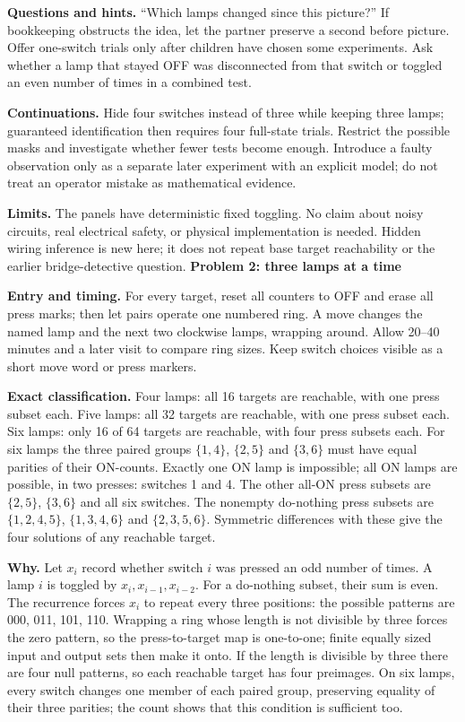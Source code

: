 \documentclass[11pt]{article}
\newcommand\lead[1]{\textbf{#1}\par}
\begin{document}
\textbf{Questions and hints.} ``Which lamps changed since this picture?'' If bookkeeping obstructs the idea, let the partner preserve a second before picture. Offer one-switch trials only after children have chosen some experiments. Ask whether a lamp that stayed OFF was disconnected from that switch or toggled an even number of times in a combined test.

\textbf{Continuations.} Hide four switches instead of three while keeping three lamps; guaranteed identification then requires four full-state trials. Restrict the possible masks and investigate whether fewer tests become enough. Introduce a faulty observation only as a separate later experiment with an explicit model; do not treat an operator mistake as mathematical evidence.

\textbf{Limits.} The panels have deterministic fixed toggling. No claim about noisy circuits, real electrical safety, or physical implementation is needed. Hidden wiring inference is new here; it does not repeat base target reachability or the earlier bridge-detective question.
\newpage
\lead{Problem 2: three lamps at a time}
\textbf{Entry and timing.} For every target, reset all counters to OFF and erase all press marks; then let pairs operate one numbered ring. A move changes the named lamp and the next two clockwise lamps, wrapping around. Allow 20--40 minutes and a later visit to compare ring sizes. Keep switch choices visible as a short move word or press markers.

\textbf{Exact classification.} Four lamps: all 16 targets are reachable, with one press subset each. Five lamps: all 32 targets are reachable, with one press subset each. Six lamps: only 16 of 64 targets are reachable, with four press subsets each. For six lamps the three paired groups $\{1,4\}$, $\{2,5\}$ and $\{3,6\}$ must have equal parities of their ON-counts. Exactly one ON lamp is impossible; all ON lamps are possible, in two presses: switches 1 and 4. The other all-ON press subsets are $\{2,5\}$, $\{3,6\}$ and all six switches. The nonempty do-nothing press subsets are $\{1,2,4,5\}$, $\{1,3,4,6\}$ and $\{2,3,5,6\}$. Symmetric differences with these give the four solutions of any reachable target.

\textbf{Why.} Let $x_i$ record whether switch $i$ was pressed an odd number of times. A lamp $i$ is toggled by $x_i,x_{i-1},x_{i-2}$. For a do-nothing subset, their sum is even. The recurrence forces $x_i$ to repeat every three positions: the possible patterns are 000, 011, 101, 110. Wrapping a ring whose length is not divisible by three forces the zero pattern, so the press-to-target map is one-to-one; finite equally sized input and output sets then make it onto. If the length is divisible by three there are four null patterns, so each reachable target has four preimages. On six lamps, every switch changes one member of each paired group, preserving equality of their three parities; the count shows that this condition is sufficient too.
\end{document}
